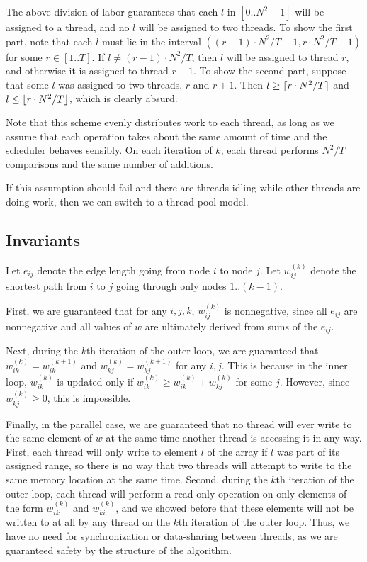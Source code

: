 \documentclass{article}
\DeclarePairedDelimiter\ceil{\lceil}{\rceil}
\DeclarePairedDelimiter\floor{\lfloor}{\rfloor}
\begin{document}
The above division of labor guarantees that each $l$ in $[0..N^2-1]$ will be assigned to a thread, and no $l$ will be assigned to two threads. To show the first part, note that each $l$ must lie in the interval $((r-1)\cdot N^2/T-1, r\cdot N^2/T-1)$ for some $r\in[1..T]$. If $l\neq (r-1)\cdot N^2/T$, then $l$ will be assigned to thread $r$, and otherwise it is assigned to thread $r-1$. To show the second part, suppose that some $l$ was assigned to two threads, $r$ and $r+1$. Then $l\geq\ceil{r\cdot N^2/T}$ and $l\leq\floor{r\cdot N^2/T}$, which is clearly absurd. 

Note that this scheme evenly distributes work to each thread, as long as we assume that each operation takes about the same amount of time and the scheduler behaves sensibly. On each iteration of $k$, each thread performs $N^2/T$ comparisons and the same number of additions. 

If this assumption should fail and there are threads idling while other threads are doing work, then we can switch to a thread pool model.
\subsection*{Invariants}
Let $e_{ij}$ denote the edge length going from node $i$ to node $j$. Let $w_{ij}^{(k)}$ denote the shortest path from $i$ to $j$ going through only nodes $1..(k-1)$. 

First, we are guaranteed that for any $i, j, k$, $w_{ij}^{(k)}$ is nonnegative, since all $e_{ij}$ are nonnegative and all values of $w$ are ultimately derived from sums of the $e_{ij}$.

Next, during the $k$th iteration of the outer loop, we are guaranteed that $w_{ik}^{(k)}=w_{ik}^{(k+1)}$ and $w_{kj}^{(k)}=w_{kj}^{(k+1)}$ for any $i,j$. This is because in the inner loop, $w_{ik}^{(k)}$ is updated only if $w_{ik}^{(k)}\ge w_{ik}^{(k)}+w_{kj}^{(k)}$ for some $j$. However, since $w_{kj}^{(k)}\geq0$, this is impossible.

Finally, in the parallel case, we are guaranteed that no thread will ever write to the same element of $w$ at the same time another thread is accessing it in any way. First, each thread will only write to element $l$ of the array if $l$ was part of its assigned range, so there is no way that two threads will attempt to write to the same memory location at the same time. 
Second, during the $k$th iteration of the outer loop, each thread will perform a read-only operation on only elements of the form $w_{ik}^{(k)}$ and $w_{ki}^{(k)}$, and we showed before that these elements will not be written to at all by any thread on the $k$th iteration of the outer loop. Thus, we have no need for synchronization or data-sharing between threads, as we are guaranteed safety by the structure of the algorithm.
\end{document}
